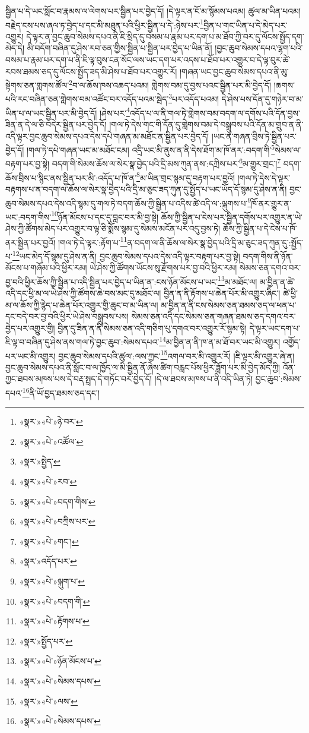 སྦྱིན་པ་དེ་ཡང་སློང་བ་རྣམས་ལ་ལེགས་པར་སྦྱིན་པར་བྱེད་དོ། །དེ་ལྟར་ན་ངོ་མ་སྙོམས་པའམ། ཚུལ་མ་ཡིན་པའམ། བརྗེད་ངས་པས་ཞལ་ཏ་བྱེད་པ་དང་མི་མཐུན་པའི་ཕྱིར་སྦྱིན་པ་དེ་:ཉེས་པར་\footnote{«སྣར་»«པེ་»ཉེ་བར་}བྱིན་པ་གང་ཡིན་པ་དེ་མེད་པར་འགྱུར། དེ་ལྟར་ན་བྱང་ཆུབ་སེམས་དཔའ་ནི་ཇི་སྲིད་དུ་བསམ་པ་རྣམ་པར་དག་པ་མ་ཐོབ་ཀྱི་བར་དུ་ལོངས་སྤྱོད་དག་མེད་དེ། མི་བདོག་བཞིན་དུ་ཤེས་རབ་ཅན་གྱིས་སྦྱིན་པ་སྦྱིན་པར་བྱེད་པ་ཡིན་ནོ། །བྱང་ཆུབ་སེམས་དཔའ་ལྷག་པའི་བསམ་པ་རྣམ་པར་དག་པ་ནི་ཇི་ལྟ་བུས་ངན་སོང་ལས་ཡང་དག་པར་འདས་པ་ཐོབ་པར་འགྱུར་བ་དེ་ལྟ་བུར་ཚེ་རབས་ཐམས་ཅད་དུ་ལོངས་སྤྱོད་ཟད་མི་ཤེས་པ་ཐོབ་པར་འགྱུར་རོ། །གཞན་ཡང་བྱང་ཆུབ་སེམས་དཔའ་ནི་མུ་སྟེགས་ཅན་གླགས་ཚོལ་\footnote{«སྣར་»«པེ་»འཚོལ་}བ་ལ་ཆོས་ཁས་འཆད་པའམ། གླེགས་བམ་དུ་བྱས་པའང་སྦྱིན་པར་མི་བྱེད་དོ། །ཆགས་པའི་རང་བཞིན་ཅན་གླེགས་བམ་འཚོང་བར་འདོད་པའམ་སྦེད་\footnote{«སྣར་»སྤྱེད་}པར་འདོད་པའམ། དེ་ཤེས་པས་དོན་དུ་གཉེར་བ་མ་ཡིན་པ་ལ་ཡང་སྦྱིན་པར་མི་བྱེད་དོ། །ཤེས་པར་\footnote{«སྣར་»«པེ་»རབ་}འདོད་པ་ལ་ནི་གལ་ཏེ་གླེགས་བམ་བདག་ལ་དགོས་པའི་དོན་བྱས་ཟིན་ན་དེ་ལ་ཅི་བདེར་སྦྱིན་པར་བྱེད་དོ། །གལ་ཏེ་དེས་གང་གི་དོན་དུ་གླེགས་བམ་དེ་བསྒྲུབས་པའི་དོན་མ་གྲུབ་ན་ནི་འདི་ལྟར་བྱང་ཆུབ་སེམས་དཔའ་དེས་དཔེ་གཞན་མ་མཐོང་ན་སྦྱིན་པར་བྱེད་དོ། །ཡང་ན་གཞན་བྲིས་ཏེ་སྦྱིན་པར་བྱེད་དོ། །གལ་ཏེ་དཔེ་གཞན་ཡང་མ་མཐོང་ངམ། འདྲི་ཡང་མི་ནུས་ན་ནི་དེས་ཐོག་མ་ཁོ་ནར་:བདག་གི་\footnote{«སྣར་»«པེ་»བདག་གིས་}སེམས་ལ་བརྟག་པར་བྱ་སྟེ། བདག་གི་སེམས་ཆོས་ལ་སེར་སྣ་བྱེད་པའི་དྲི་མས་ཀུན་ནས་:དཀྲིས་པར་\footnote{«སྣར་»«པེ་»བཀྲིས་པར་}མ་གྱུར་གྲང་།\footnote{«སྣར་»«པེ་»གང་།} བདག་ཆོས་བྲིས་པ་སྙིང་ནས་སྦྱིན་པར་མི་:འདོད་པ་ཁོ་ན་\footnote{«སྣར་»འདོད་པར་}མ་ཡིན་གྲང་སྙམ་དུ་བརྟག་པར་བྱའོ། །གལ་ཏེ་དེས་དེ་ལྟར་བརྟགས་པ་ན་བདག་ལ་ཆོས་ལ་སེར་སྣ་བྱེད་པའི་དྲི་མ་ཅུང་ཟད་ཀུན་དུ་སྤྱོད་པ་ཡང་ཡོད་དོ་སྙམ་དུ་ཤེས་ན་ནི། བྱང་ཆུབ་སེམས་དཔའ་དེས་འདི་སྙམ་དུ་གལ་ཏེ་བདག་ཆོས་ཀྱི་སྦྱིན་པ་འདིས་ཚེ་འདི་ལ་:ལྐུགས་པ་\footnote{«སྣར་»«པེ་»ལྐུག་པ་}ཁོ་ནར་གྱུར་ན་ཡང་:བདག་གིས་\footnote{«སྣར་»«པེ་»བདག་གི་}ཉོན་མོངས་པ་དང་དུ་བླང་བར་མི་བྱ་སྟེ། ཆོས་ཀྱི་སྦྱིན་པ་ངེས་པར་སྦྱིན་དགོས་པར་འགྱུར་ན་ཡེ་ཤེས་ཀྱི་ཚོགས་མེད་པར་འགྱུར་བ་ལྟ་ཅི་སྨོས་སྙམ་དུ་སེམས་མངོན་པར་འདུ་བྱས་ཏེ། ཆོས་ཀྱི་སྦྱིན་པ་དེ་ངེས་པ་ཁོ་ནར་སྦྱིན་པར་བྱའོ། །གལ་ཏེ་དེ་ལྟར་:རྟོག་པ་\footnote{«སྣར་»«པེ་»རྟོགས་པ་}ན་བདག་ལ་ནི་ཆོས་ལ་སེར་སྣ་བྱེད་པའི་དྲི་མ་ཅུང་ཟད་ཀུན་དུ་:སྤྱོད་པ་\footnote{«སྣར་»སྤྱོད་པར་}ཡང་མེད་དོ་སྙམ་དུ་ཤེས་ན་ནི། བྱང་ཆུབ་སེམས་དཔའ་དེས་འདི་ལྟར་བརྟག་པར་བྱ་སྟེ། བདག་གིས་ནི་ཉོན་མོངས་པ་གཞོམ་པའི་ཕྱིར་རམ། ཡེ་ཤེས་ཀྱི་ཚོགས་ཡོངས་སུ་རྫོགས་པར་བྱ་བའི་ཕྱིར་རམ། སེམས་ཅན་དགའ་བར་བྱ་བའི་ཕྱིར་ཆོས་ཀྱི་སྦྱིན་པ་འདི་སྦྱིན་པར་བྱེད་པ་ཡིན་ན་:ངས་ཉོན་མོངས་པ་ཡང་\footnote{«སྣར་»«པེ་»ཉོན་མོངས་པ་}མ་མཐོང་ལ། མ་བྱིན་ན་ཚེ་འདི་དང་ཕྱི་མ་ལ་ཡེ་ཤེས་ཀྱི་ཚོགས་ཆེ་བས་མང་དུ་མཐོང་ལ། བྱིན་ན་ནི་རྟོགས་པ་ཆེན་པོར་མི་འགྱུར་ཞིང་། ཚེ་ཕྱི་མ་ལ་ཆོས་ཀྱི་རྙེད་པ་ཆེན་པོར་འགྱུར་གྱི་ཆུང་བ་མ་ཡིན་ལ། མ་བྱིན་ན་ནི་ངས་སེམས་ཅན་ཐམས་ཅད་ལ་ཕན་པ་དང་བདེ་བར་བྱ་བའི་ཕྱིར་ཡེ་ཤེས་བསྒྲུབས་པས། སེམས་ཅན་འདི་དང་སེམས་ཅན་གཞན་ཐམས་ཅད་དགའ་བར་བྱེད་པར་འགྱུར་གྱི། བྱིན་དུ་ཟིན་ན་ནི་སེམས་ཅན་འདི་གཅིག་པུ་དགའ་བར་འགྱུར་རོ་སྙམ་སྟེ། དེ་ལྟར་ཡང་དག་པ་ཇི་ལྟ་བ་བཞིན་དུ་ཤེས་ནས་གལ་ཏེ་བྱང་ཆུབ་:སེམས་དཔའ་\footnote{«སྣར་»«པེ་»སེམས་དཔས་}མ་བྱིན་ན་ནི་ཁ་ན་མ་ཐོ་བར་ཡང་མི་འགྱུར། འགྱོད་པར་ཡང་མི་འགྱུར། བྱང་ཆུབ་སེམས་དཔའི་ཚུལ་:ལས་ཀྱང་\footnote{«སྣར་»«པེ་»ལས་}འགལ་བར་མི་འགྱུར་རོ། །ཇི་ལྟར་མི་འགྱུར་ཞེ་ན། བྱང་ཆུབ་སེམས་དཔའ་ནི་སློང་བ་ལ་ཁྱོད་ལ་མི་སྦྱིན་ནོ་ཞེས་ཚིག་བརླང་པོས་ཕྱིར་ཟློག་པར་མི་བྱེད་མོད་ཀྱི། འོན་ཀྱང་ཐབས་མཁས་པས་དེ་བརྡ་སྤྲད་དེ་གཏོང་བར་བྱེད་དོ། །དེ་ལ་ཐབས་མཁས་པ་ནི་འདི་ཡིན་ཏེ། བྱང་ཆུབ་:སེམས་དཔའ་\footnote{«སྣར་»«པེ་»སེམས་དཔས་}ནི་ཡོ་བྱད་ཐམས་ཅད་དང་། 